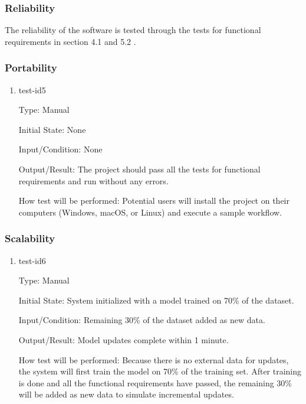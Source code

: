 \documentclass[12pt, titlepage]{article}
\begin{document}
\subsubsection{Reliability}

The reliability of the software is tested through the tests for
functional requirements in section 4.1 and 5.2 .

\subsubsection{Portability}

\begin{enumerate}

\item{test-id5\\}

Type: Manual
					
Initial State: None
					
Input/Condition: None
					
Output/Result: The project should pass all the tests for functional requirements and run without any errors.

How test will be performed: Potential users will install the project on their computers (Windows, macOS, or Linux) and execute a sample workflow. 
\end{enumerate}


\subsubsection{Scalability}

\begin{enumerate}

\item{test-id6\\}

Type: Manual

Initial State: System initialized with a model trained on 70\% of the dataset.

Input/Condition: Remaining 30\% of the dataset added as new data.

Output/Result: Model updates complete within 1 minute.

How test will be performed: Because there is no external data for updates, the system will first train the model on 70\% of the training set. After training is done and all the functional requirements have passed, the remaining 30\% will be added as new data to simulate incremental updates.


\end{enumerate}
\end{document}
